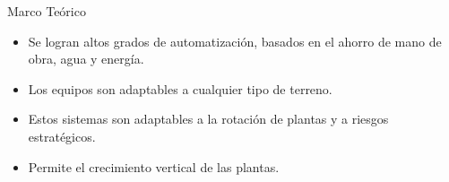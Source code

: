 \documentclass{beamer}
\begin{document}
\begin{frame}[fragile]{}
\begin{columns}[t]
\begin{column}{0.96\textwidth}
\begin{block}{Marco Teórico}
\begin{itemize}

\item Se logran altos grados de automatización, basados en el ahorro de mano de obra, agua y energía.
\item Los equipos son adaptables a cualquier tipo de terreno.
\item Estos sistemas son adaptables a la rotación de plantas y a riesgos estratégicos.
\item Permite el crecimiento vertical de las plantas.

\end{itemize}
    \end{block}
  \end{column}
\end{columns}


\justifying
\begin{columns}[t]
	

\end{columns}
\end{frame}
\end{document}
